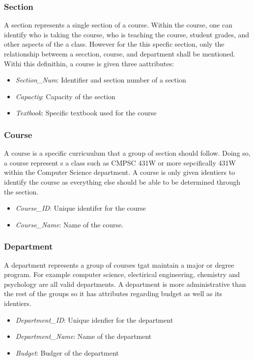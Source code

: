 \documentclass{article}
\begin{document}
  \subsubsection{Section}\label{sec:Concept:Courses:Section}
    A section represents a single section of a course.  Within the course, one can identify who is taking the course, who is teaching the course, student grades, and other aspects of the a class.  However for the this specfic section, only the relationship betweem a secction, course, and department shall be mentioned.  Withi this definithin, a course is given three aattributes:
    \begin{itemize}
      \item \textit{Section\_Num}: Identifier and section number of a section
      \item \textit{Capactiy}: Capacity of the section
      \item \textit{Textbook}: Specific textbook used for the course
    \end{itemize}

  \subsubsection{Course}\label{sec:Concept:Courses:Course}
    A course is a specific curricuulum that a group of section should follow.  Doing so, a course represent s a class such as CMPSC 431W or more sepcifically 431W within the Computer Science department.  A course is only given identiers to identify the course as everything else should be able to be determined through the section.
    \begin{itemize}
      \item \textit{Course\_ID}: Unique identifer for the course
      \item \textit{Course\_Name}: Name of the course.
    \end{itemize}

  \subsubsection{Department}\label{sec:Concept:Courses:Department}
    A department represents a group of courses tgat maintain a major or degree program.  For example computer science, electirical engineering, chemistry and psychology are all valid departments.  A department is more administrative than the rest of the groups so it has attributes regarding budget as well as its identiers.
    \begin{itemize}
      \item \textit{Department\_ID}: Unique idenfier for the department
      \item \textit{Department\_Name}: Name of the department
      \item \textit{Budget}: Budger of the department
    \end{itemize}
\end{document}
